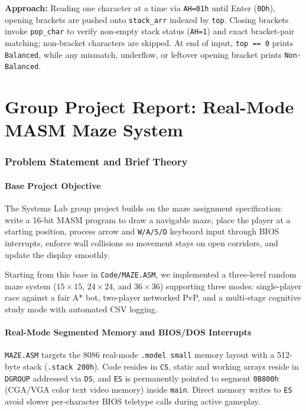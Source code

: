 \documentclass[11pt,a4paper]{article}
\begin{document}
\textbf{Approach:} Reading one character at a time via \texttt{AH=01h} until Enter (\texttt{0Dh}), opening brackets are pushed onto \texttt{stack\_arr} indexed by \texttt{top}. Closing brackets invoke \texttt{pop\_char} to verify non-empty stack status (\texttt{AH=1}) and exact bracket-pair matching; non-bracket characters are skipped. At end of input, \texttt{top == 0} prints \texttt{Balanced}, while any mismatch, underflow, or leftover opening bracket prints \texttt{Non-Balanced}.



\newpage

\part{Group Project Report: Real-Mode MASM Maze System}

\section{Problem Statement and Brief Theory}

\subsection{Base Project Objective}
The Systems Lab group project builds on the maze assignment specification: write a 16-bit MASM program to draw a navigable maze, place the player at a starting position, process arrow and \texttt{W/A/S/D} keyboard input through BIOS interrupts, enforce wall collisions so movement stays on open corridors, and update the display smoothly.

Starting from this base in \texttt{Code/MAZE.ASM}, we implemented a three-level random maze system ($15\times 15$, $24\times 24$, and $36\times 36$) supporting three modes: single-player race against a fair A* bot, two-player networked PvP, and a multi-stage cognitive study mode with automated CSV logging.

\subsection{Real-Mode Segmented Memory and BIOS/DOS Interrupts}
\texttt{MAZE.ASM} targets the 8086 real-mode \texttt{.model small} memory layout with a 512-byte stack (\texttt{.stack 200h}). Code resides in \texttt{CS}, static and working arrays reside in \texttt{DGROUP} addressed via \texttt{DS}, and \texttt{ES} is permanently pointed to segment \texttt{0B800h} (CGA/VGA color text video memory) inside \texttt{main}. Direct memory writes to \texttt{ES} avoid slower per-character BIOS teletype calls during active gameplay.
\end{document}
